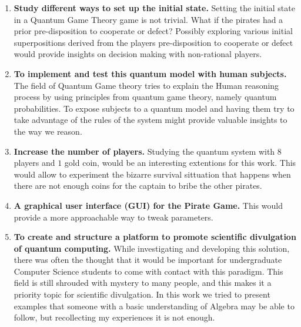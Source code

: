 \begin{enumerate}
\item \textbf{Study different ways to set up the initial state.} Setting the initial state in a Quantum Game Theory game is not trivial. What if the pirates had a prior pre-disposition to cooperate or defect? Possibly exploring various initial superpositions derived from the players pre-disposition to cooperate or defect would provide insights on decision making with non-rational players. 
\item \textbf{To implement and test this quantum model with human subjects.} The field of Quantum Game theory tries to explain the Human reasoning process by using principles from quantum game theory, namely quantum probabilities. To expose subjects to a quantum model and having them try to take advantage of the rules of the system might provide valuable insights to the way we reason. 
\item \textbf{Increase the number of players.} Studying the quantum system with $8$ players and $1$ gold coin, would be an interesting extentions for this work. This would allow to experiment the bizarre survival sittuation that happens when there are not enough coins for the captain to bribe the other pirates.
\item \textbf{A graphical user interface (GUI) for the Pirate Game.} This would provide a more approachable way to tweak parameters.
\item \textbf{To create and structure a platform to promote scientific divulgation of quantum computing.} While investigating and developing this solution, there was often the thought that it would be important for undergraduate Computer Science students to come with contact with this paradigm. This field is still shrouded with mystery to many people, and this makes it a priority topic for scientific divulgation. In this work we tried to present examples that someone with a basic understanding of Algebra may be able to follow, but recollecting my experiences it is not enough.
\end{enumerate}

\cleardoublepage